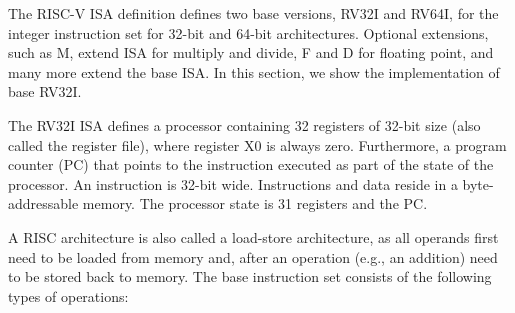 \documentclass[%
    10pt,
    headinclude, footinclude=false,
    openright, %
    notitlepage,
    cleardoublepage=empty,
    headsepline,
    numbers=noenddot,
    bibliography=totoc, index=totoc,
    ]{scrbook}
\begin{document}
The RISC-V ISA definition defines two base versions, RV32I and RV64I, for the integer
instruction set for 32-bit and 64-bit architectures. Optional extensions, such as M,
extend ISA for multiply and divide, F and D for floating point, and many more extend the base ISA.
In this section, we show the implementation of base RV32I.

The RV32I ISA defines a processor containing 32 registers of 32-bit size (also called
the register file), where register X0 is always zero. Furthermore, a program counter (PC)
that points to the instruction executed as part of the state of the processor.
An instruction is 32-bit wide.
Instructions and data reside in a byte-addressable memory.
The processor state is 31 registers and the PC.

A RISC architecture is also called a load-store architecture, as all operands first need to
be loaded from memory and, after an operation (e.g., an addition) need to be stored
back to memory. The base instruction set consists of the following types of operations:
\end{document}
